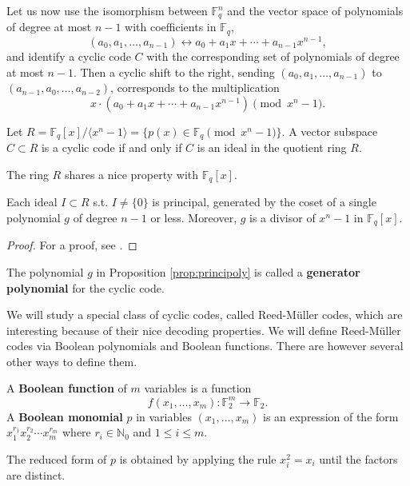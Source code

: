 \documentclass[english,bachelor]{liumaiex}
\begin{document}
Let us now use the isomorphism between $\mathbb{F}_q^n$ and the vector space of polynomials of degree at most $n-1$ with coefficients in $\mathbb{F}_q$,
\begin{displaymath}
(a_0,a_1,\dots,a_{n-1})\leftrightarrow a_0+a_1x+\cdots+a_{n-1}x^{n-1},
\end{displaymath}
and identify a cyclic code $C$ with the corresponding set of polynomials of degree at most $n-1$. Then a cyclic shift to the right, sending $(a_0,a_1,\dots,a_{n-1})$ to $(a_{n-1},a_0,\dots,a_{n-2})$, corresponds to the multiplication $$x\cdot (a_0+a_1x+\cdots+a_{n-1}x^{n-1}) \pmod{x^n-1}.$$

\begin{prop}
Let $R=\mathbb{F}_q[x]/\langle x^n-1\rangle = \{p(x)\in\mathbb{F}_q \pmod{x^n-1}\}$. A vector subspace $C\subset R$ is a cyclic code if and only if $C$ is an ideal in the quotient ring $R$.
\end{prop}
The ring $R$ shares a nice property with $\mathbb{F}_q[x]$.

\begin{prop}
\label{prop:principoly}
Each ideal $I\subset R$ s.t. $I\neq\{0\}$ is principal, generated by the coset of a single polynomial $g$ of degree $n-1$ or less. Moreover, $g$ is a divisor of $x^n-1$ in $\mathbb{F}_q[x]$.
\end{prop}
\begin{proof}
For a proof, see \cite[p. 469]{uag}.
\end{proof}

\begin{define}
The polynomial $g$ in Proposition \ref{prop:principoly} is called a \textbf{generator polynomial} for the cyclic code.
\end{define}
We will study a special class of cyclic codes, called Reed-M{\"u}ller codes, which are interesting because of their nice decoding properties. We will define Reed-M{\"u}ller codes via Boolean polynomials and Boolean functions. There are however several other ways to define them.

\begin{define}
A \textbf{Boolean function} of $m$ variables is a function
\begin{displaymath}
f(x_1,\dots,x_m)\colon \mathbb{F}_2^m\to\mathbb{F}_2.
\end{displaymath}
A \textbf{Boolean monomial} $p$ in variables $(x_1,\dots,x_m)$ is an expression of the form $x_1^{r_1}x_2^{r_2}\cdots x_m^{r_m}$ where $r_i\in\mathbb{N}_{0}$ and $1\leq i\leq m$.
\end{define}
The reduced form of $p$ is obtained by applying the rule $x_i^2=x_i$ until the factors are distinct.
\end{document}
